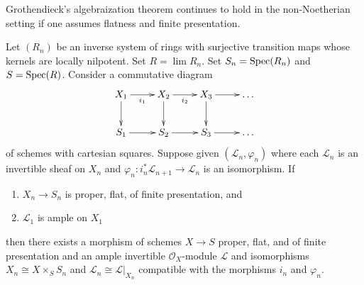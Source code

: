 \begin{lemma}
\label{lemma-polarized-strong-effectiveness}
\begin{slogan}
Grothendieck's algebraization theorem continues to hold in
the non-Noetherian setting if one assumes flatness and
finite presentation.
\end{slogan}
Let $(R_n)$ be an inverse system of rings with surjective transition maps
whose kernels are locally nilpotent. Set $R = \lim R_n$.
Set $S_n = \mathop{\mathrm{Spec}}(R_n)$ and $S = \mathop{\mathrm{Spec}}(R)$. Consider a commutative diagram
$$
\xymatrix{
X_1 \ar[r]_{i_1} \ar[d] & X_2 \ar[r]_{i_2} \ar[d] & X_3 \ar[r] \ar[d] &
\ldots \\
S_1 \ar[r] & S_2 \ar[r] & S_3 \ar[r] & \ldots
}
$$
of schemes with cartesian squares. Suppose given $(\mathcal{L}_n, \varphi_n)$
where each $\mathcal{L}_n$ is an invertible sheaf on $X_n$ and
$\varphi_n : i_n^*\mathcal{L}_{n + 1} \to \mathcal{L}_n$ is an isomorphism.
If
\begin{enumerate}
\item $X_n \to S_n$ is proper, flat, of finite presentation, and
\item $\mathcal{L}_1$ is ample on $X_1$
\end{enumerate}
then there exists a morphism of schemes $X \to S$
proper, flat, and of finite presentation
and an ample invertible $\mathcal{O}_X$-module $\mathcal{L}$
and isomorphisms $X_n \cong X \times_S S_n$ and
$\mathcal{L}_n \cong \mathcal{L}|_{X_n}$ compatible with
the morphisms $i_n$ and $\varphi_n$.
\end{lemma}

